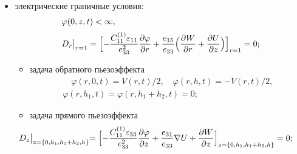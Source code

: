 \begin{itemize}
\begin{equation}
\label{shlya:eq7}
\hspace{-3mm}
\begin{array}{c}
\displaystyle
\Bigl[\frac{C_{13}^{( 1 )} }{C_{11}^{( 1 )} }\nabla  U+\frac{C_{33}^{( 1 )} }{C_{11}^{( 1 )} 
}\frac{\partial W}{\partial z}+\frac{\partial \varphi }{\partial z}\Bigr]_{z=h_1}
=
\Bigl[\frac{C_{13}^{( 2 )} }{C_{11}^{( 1 )} }\nabla  U+\frac{C_{33}^{( 2 )} }{C_{11}^{( 1 )}  }\frac{\partial W}{\partial z}\Bigr]_{z=h_1},\\[5mm]
\displaystyle
\Bigl[ \frac{C_{55}^{( 1 )} }{C_{11}^{( 1 )} }\Bigl(\frac{\partial W}{\partial r}+\frac{\partial U}{\partial z} \Bigr)+\frac{e_{15} }{e_{33}}\frac{\partial \varphi }{\partial 
r}\Bigr]_{z=h_1 +h_2 }
=
\Bigl[
\frac{C_{55}^{( 2 )} }{C_{11}^{( 1 )} }\Bigl(\frac{\partial W}{\partial r}+\frac{\partial U}{\partial z}\Bigr)
\Bigr]_{z=h_1 +h_2 },\\[4mm]
W(z+0)=W(z-0), \quad  U(z+0)=U(z-0);
\end{array} \hspace{-3mm}
\end{equation}

\item электрические граничные условия:
\begin{equation}
\label{shlya:eq8}
\begin{array}{l}
\varphi (0,z,t)<\infty,
\\[2mm]
\displaystyle
D_{r} \big|_{r=1} =
\Bigl[
-\frac{C_{11}^{( 1 )} \varepsilon _{11} 
}{e_{33}^2 }\frac{\partial \varphi }{\partial r}+\frac{e_{15} }{e_{33} 
}\Bigl(\frac{\partial W}{\partial r}+\frac{\partial U}{\partial z}\Bigr)\Bigr]_{r=1}=0;
\end{array}
\end{equation}

\begin{itemize}

\item[а)] задача обратного пьезоэффекта 
\begin{equation}
\label{shlya:eq10}
\begin{array}{c}
\quad \varphi (r,0,t)=V( r,t )/2, \quad  \varphi (r,h,t)=- V( r,t )/2, \\[2mm]
\varphi (r,h_1,t) = \varphi (r,h_1+h_2,t) =0;
\end{array}
\end{equation}

\item[б)] задача прямого пьезоэффекта 
\begin{equation}
\hspace{-1cm}
\label{shlya:eq10}
D_z\bigl|_{z=\{0, h_1, h_1+h_2, h\} } =
\Bigl[
-\frac{C_{11}^{( 1 )} \varepsilon _{33} }{e_{33}^2 
}\frac{\partial \varphi }{\partial z}+\frac{e_{31} }{e_{33} }\nabla 
U+\frac{\partial W}{\partial z}\Bigr]_{z=\{0, h_1, h_1+h_2, h\} }=0;
\end{equation}



\end{itemize}
\end{itemize}

